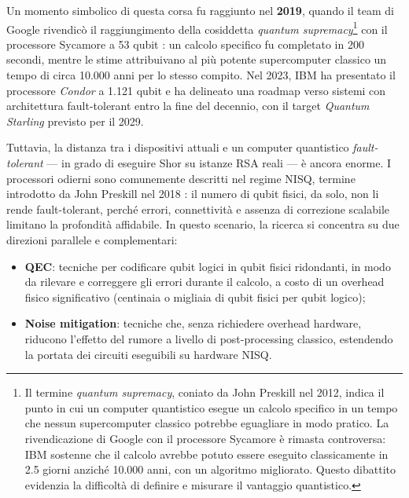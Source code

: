 \begin{onehalfspace}
Un momento simbolico di questa corsa fu raggiunto nel \textbf{2019}, quando il team di Google rivendicò il raggiungimento della cosiddetta \textit{quantum supremacy}\footnote{Il termine \textit{quantum supremacy}, coniato da John Preskill nel 2012, indica il punto in cui un computer quantistico esegue un calcolo specifico in un tempo che nessun supercomputer classico potrebbe eguagliare in modo pratico. La rivendicazione di Google con il processore Sycamore è rimasta controversa: IBM sostenne che il calcolo avrebbe potuto essere eseguito classicamente in 2.5 giorni anziché 10.000 anni, con un algoritmo migliorato. Questo dibattito evidenzia la difficoltà di definire e misurare il vantaggio quantistico.} con il processore Sycamore a 53 qubit \cite{arute2019}: un calcolo specifico fu completato in 200 secondi, mentre le stime attribuivano al più potente supercomputer classico un tempo di circa 10.000 anni per lo stesso compito. Nel 2023, IBM ha presentato il processore \textit{Condor} a 1.121 qubit e ha delineato una roadmap \cite{ibm_roadmap2025} verso sistemi con architettura fault-tolerant entro la fine del decennio, con il target \textit{Quantum Starling} previsto per il 2029.

Tuttavia, la distanza tra i dispositivi attuali e un computer quantistico \textit{fault-tolerant} --- in grado di eseguire Shor su istanze RSA reali --- è ancora enorme. I processori odierni sono comunemente descritti nel regime \ac{NISQ}, termine introdotto da John Preskill nel 2018 \cite{preskill2018}: il numero di qubit fisici, da solo, non li rende fault-tolerant, perché errori, connettività e assenza di correzione scalabile limitano la profondità affidabile. In questo scenario, la ricerca si concentra su due direzioni parallele e complementari:

\begin{itemize}
    \item \textbf{\ac{QEC}}: tecniche per codificare qubit logici in qubit fisici ridondanti, in modo da rilevare e correggere gli errori durante il calcolo, a costo di un overhead fisico significativo (centinaia o migliaia di qubit fisici per qubit logico);

    \item \textbf{Noise mitigation}: tecniche che, senza richiedere overhead hardware, riducono l'effetto del rumore a livello di post-processing classico, estendendo la portata dei circuiti eseguibili su hardware NISQ.
\end{itemize}

\end{onehalfspace}

